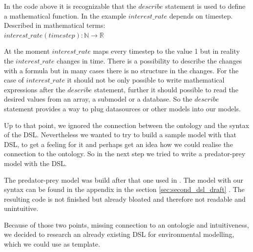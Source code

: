 \par
In the code above it is recognizable that the $describe$ statement is used to define a mathematical function. In the example $interest\_rate$ depends on timestep. Described in mathematical terms:\\
$interest\_rate(timestep) : \mathbb{N} \rightarrow  \mathbb{R}$
\par
At the moment $interest\_rate$ maps every timestep to the value 1 but in reality the $interest\_rate$ changes in time. There is a possibility to describe the changes with a formula but in many cases there is no structure in the changes. For the case of $interest\_rate$ it should not be only possible to write mathematical expressions after the $describe$ statement, further it should possible to read the desired values from an array, a submodel or a database. So the $describe$ statement provides a way to plug datasources or other models into our models.
\par
Up to that point, we ignored the connection between the ontology and the syntax of the DSL. Nevertheless we wanted to try to build a sample model with that DSL, to get a feeling for it and perhaps get an idea how we could realise the connection to the ontology. So in the next step we tried to write a predator-prey model with the DSL.
\par
The predator-prey model was build after that one used in \autocite{dsl:dynamo}. The model with our syntax can be found in the appendix in the section \ref{sec:second_dsl_draft} .
The resulting code is not finished but already bloated and therefore not readable and unintuitive.
\par
Because of those two points, missing connection to an ontologie and intuitiveness, we decided to research an already existing DSL for environmental modelling, which we could use as template.

